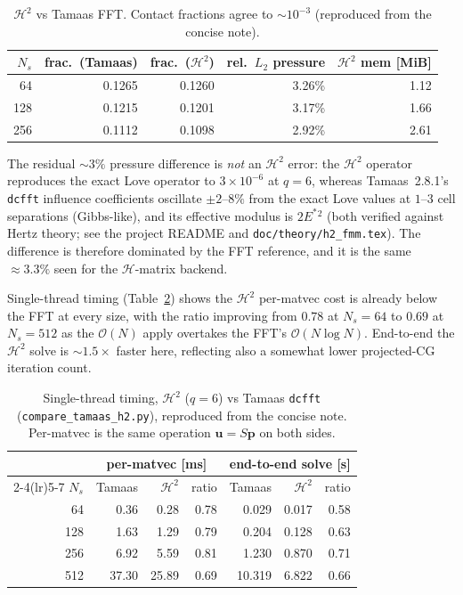 \documentclass[11pt,a4paper]{article}
\newcommand{\Es}{E^{*}}
\newcommand{\Order}{\mathcal{O}}
\newcommand{\pp}{\mathbf{p}}
\newcommand{\Htwo}{\mathcal{H}^2}
\newcommand{\Hmat}{\mathcal{H}}
\newcommand{\code}[1]{\texttt{#1}}
\theoremstyle{definition}
\theoremstyle{remark}
\begin{document}
\begin{table}[h]
\centering
\begin{tabular}{rrrrr}
\toprule
$N_s$ & frac.\ (Tamaas) & frac.\ ($\Htwo$) & rel.\ $L_2$ pressure & $\Htwo$ mem [MiB] \\
\midrule
64  & 0.1265 & 0.1260 & 3.26\% & 1.12 \\
128 & 0.1215 & 0.1201 & 3.17\% & 1.66 \\
256 & 0.1112 & 0.1098 & 2.92\% & 2.61 \\
\bottomrule
\end{tabular}
\caption{$\Htwo$ vs Tamaas FFT. Contact fractions agree to $\sim10^{-3}$
(reproduced from the concise note).}
\label{tab:tamaas}
\end{table}

The residual $\sim3\%$ pressure difference is \emph{not} an $\Htwo$ error: the
$\Htwo$ operator reproduces the exact Love operator to $3\times10^{-6}$ at $q=6$,
whereas Tamaas~2.8.1's \code{dcfft} influence coefficients oscillate $\pm2$--$8\%$
from the exact Love values at $1$--$3$ cell separations (Gibbs-like), and its
effective modulus is $2\Es{}^2$ (both verified against Hertz theory; see the
project README and \code{doc/theory/h2\_fmm.tex}). The difference is therefore
dominated by the FFT reference, and it is the same $\approx3.3\%$ seen for the
$\Hmat$-matrix backend.

Single-thread timing (Table~\ref{tab:tamaas-time}) shows the $\Htwo$ per-matvec
cost is already below the FFT at every size, with the ratio improving from $0.78$
at $N_s=64$ to $0.69$ at $N_s=512$ as the $\Order(N)$ apply overtakes the FFT's
$\Order(N\log N)$. End-to-end the $\Htwo$ solve is $\sim1.5\times$ faster here,
reflecting also a somewhat lower projected-CG iteration count.

\begin{table}[h]
\centering
\begin{tabular}{rrrrrrr}
\toprule
& \multicolumn{3}{c}{per-matvec [ms]} & \multicolumn{3}{c}{end-to-end solve [s]} \\
\cmidrule(lr){2-4}\cmidrule(lr){5-7}
$N_s$ & Tamaas & $\Htwo$ & ratio & Tamaas & $\Htwo$ & ratio \\
\midrule
64  &  0.36 &  0.28 & 0.78 &  0.029 & 0.017 & 0.58 \\
128 &  1.63 &  1.29 & 0.79 &  0.204 & 0.128 & 0.63 \\
256 &  6.92 &  5.59 & 0.81 &  1.230 & 0.870 & 0.71 \\
512 & 37.30 & 25.89 & 0.69 & 10.319 & 6.822 & 0.66 \\
\bottomrule
\end{tabular}
\caption{Single-thread timing, $\Htwo$ ($q=6$) vs Tamaas \code{dcfft}
(\code{compare\_tamaas\_h2.py}), reproduced from the concise note. Per-matvec is
the same operation $\mathbf u=S\pp$ on both sides.}
\label{tab:tamaas-time}
\end{table}
\end{document}
